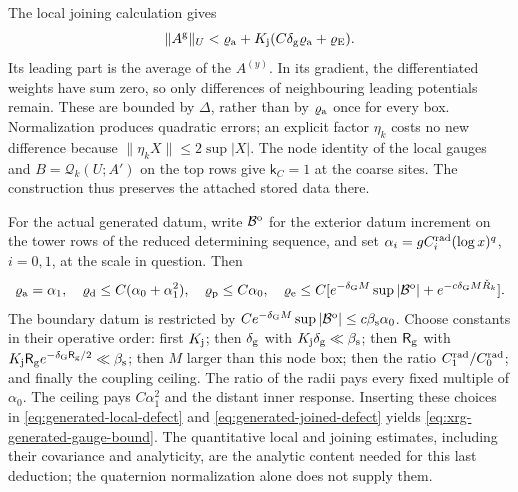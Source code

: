 \documentclass[11pt,letterpaper,reqno]{amsart}
\theoremstyle{definition}
\theoremstyle{remark}
\begin{document}
The local joining calculation gives
\begin{equation}\label{eq:generated-joined-defect}
 \|A^{\mathrm g}\|_U
       <\varrho_{\rm a}
                   +K_{\rm j}(C\delta_{\rm g}\varrho_{\rm a}
                                                   +\varrho_{\rm E}).
\end{equation}
Its leading part is the average of the \(A^{(y)}\).
In its gradient, the differentiated weights have
sum zero, so only differences of neighbouring
leading potentials remain. These are bounded by
\(\Delta\), rather than by
\(\varrho_{\rm a}\) once for every box.
Normalization produces quadratic errors; an
explicit factor \(\eta_k\) costs no new difference
because \(\|\eta_kX\|\le2\sup|X|\).
The node identity of the local gauges and
\(B=\mathcal Q_k(U;A')\) on the top rows give
\(\mathsf k_C=1\) at the coarse sites.
The construction thus preserves the attached
stored data there.

For the actual generated datum, write \(\mathcal B^{\rm o}\)
for the exterior datum increment on the tower rows of the
reduced determining sequence, and set
\(\alpha_i=gC_i^{\rm rad}(\log x)^q\), \(i=0,1\),
at the scale in question. Then
\[
 \varrho_{\rm a}=\alpha_1,\quad
 \varrho_{\rm d}\le C(\alpha_0+\alpha_1^2),\quad
 \varrho_{\rm p}\le C\alpha_0,\quad
 \varrho_{\rm e}\le
 C[e^{-\delta_{\mathrm G}M}\sup|\mathcal B^{\rm o}|
                      +e^{-c\delta_{\mathrm G}M\check R_k}].
\]
The boundary datum is restricted by
\(Ce^{-\delta_{\mathrm G}M}\sup|\mathcal B^{\rm o}|
\le c\beta_{\mathrm s}\alpha_0\).
Choose constants in their operative order:
first \(K_{\rm j}\); then
\(\delta_{\rm g}\) with
\(K_{\rm j}\delta_{\rm g}\ll\beta_{\mathrm s}\);
then \(\mathsf R_{\rm g}\) with
\(K_{\rm j}\mathsf R_{\rm g}
 e^{-\delta_{\mathrm G}\mathsf R_{\rm g}/2}
\ll\beta_{\mathrm s}\); then \(M\) larger than this
node box; then the ratio \(C_1^{\rm rad}/C_0^{\rm rad}\);
and finally the coupling ceiling.
The ratio of the radii pays every fixed multiple
of \(\alpha_0\). The ceiling pays
\(C\alpha_1^2\) and the distant inner response.
Inserting these choices in
\eqref{eq:generated-local-defect} and
\eqref{eq:generated-joined-defect} yields
\eqref{eq:xrg-generated-gauge-bound}.
The quantitative local and joining estimates,
including their covariance and analyticity,
are the analytic content needed for this last
deduction; the quaternion normalization alone
does not supply them.
\end{document}
